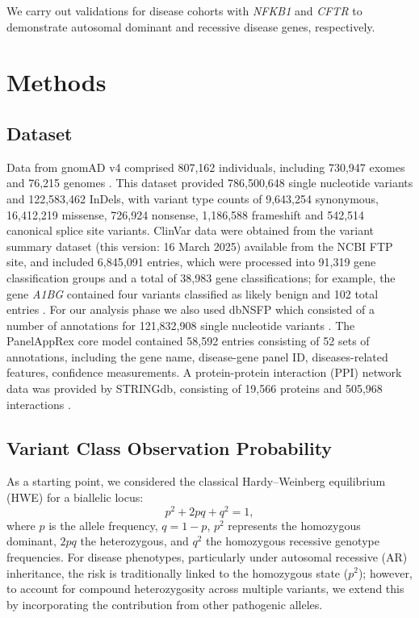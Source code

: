 We carry out validations for disease cohorts with \textit{NFKB1} 
\cite{tuijnenburgNFKB12018,
who1997primary,
cunningham1999common,
oksenhendler2008infections}
and \textit{CFTR} 
\cite{naito2023uk, castellani2013cftr2, Grasemann2023cftr}
to demonstrate autosomal dominant and recessive disease genes, respectively.

\section{Methods}
\subsection{Dataset}

Data from gnomAD v4 comprised 807,162 individuals, including 730,947 exomes and 76,215 genomes \cite{karczewski2020mutational}. This dataset provided 786,500,648 single nucleotide variants and 122,583,462 InDels, with variant type counts of 9,643,254 synonymous, 16,412,219 missense, 726,924 nonsense, 1,186,588 frameshift and 542,514 canonical splice site variants. ClinVar data were obtained from the variant summary dataset (this version: 16 March 2025) available from the NCBI FTP site, and included 6,845,091 entries, which were processed into 91,319 gene classification groups and a total of 38,983 gene classifications; for example, the gene \textit{A1BG} contained four variants classified as likely benign and 102 total entries \cite{landrum_clinvar_2018}. For our analysis phase we also used dbNSFP which consisted of a number of annotations for 121,832,908 single nucleotide variants 
\cite{liu_dbnsfp_2020}. 
The PanelAppRex core model contained 58,592 entries consisting of 52 sets of annotations, including the gene name, disease-gene panel ID, diseases-related features, confidence measurements.
\cite{lawless_panelapprex_2025}
A protein-protein interaction (PPI) network data was provided by STRINGdb, consisting of 19,566 proteins and 505,968 interactions \cite{szklarczyk2025string}.


\subsection{Variant Class Observation Probability}
As a starting point, we considered the classical Hardy–Weinberg equilibrium (HWE) for a biallelic locus:
\[
p^2 + 2pq + q^2 = 1,
\]
where \(p\) is the allele frequency, \(q = 1 - p\), \(p^2\) represents the homozygous dominant, \(2pq\) the heterozygous, and \(q^2\) the homozygous recessive genotype frequencies. For disease phenotypes, particularly under autosomal recessive (AR) inheritance, the risk is traditionally linked to the homozygous state (\(p^2\)); however, to account for compound heterozygosity across multiple variants, we extend this by incorporating the contribution from other pathogenic alleles.

